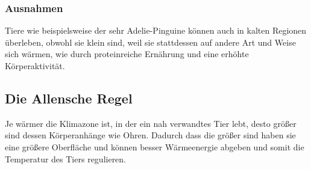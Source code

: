 \documentclass{article}
\begin{document}
\subsubsection{Ausnahmen}
Tiere wie beispielsweise der sehr Adelie-Pinguine können auch in kalten Regionen überleben, obwohl sie klein sind, weil sie stattdessen auf andere Art und Weise sich wärmen, wie durch proteinreiche Ernährung und eine erhöhte Körperaktivität.
 
\subsection{Die Allensche Regel}
Je wärmer die Klimazone ist, in der ein nah verwandtes Tier lebt, desto größer sind dessen Körperanhänge wie Ohren. Dadurch dass die größer sind haben sie eine größere Oberfläche und können besser Wärmeenergie abgeben und somit die Temperatur des Tiers regulieren.
\end{document}
